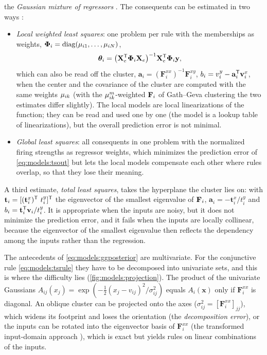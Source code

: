 the \emph{Gaussian mixture of regressors} \cite{gershenfeld:1999:cwm}. The consequents can be estimated in two ways \cite{abonyi:2002:mgg,abonyi:2000:localglobal}:
\begin{itemize}
  \item \emph{Local weighted least squares}: one problem per rule with the memberships as weights, $\boldsymbol\Phi_i=\operatorname{diag}(\mu_{i1},\dots,\mu_{iN})$,
  \begin{equation}
    \boldsymbol\theta_i=\big(\mathbf{X}_e^{\mathsf{T}}\boldsymbol\Phi_i\mathbf{X}_e\big)^{-1}\mathbf{X}_e^{\mathsf{T}}\boldsymbol\Phi_i\mathbf{y},
    \label{eq:models:wls}
  \end{equation}
  which can also be read off the cluster, $\mathbf{a}_i=(\mathbf{F}^{xx}_i)^{-1}\mathbf{F}^{xy}_i$, $b_i=v^y_i-\mathbf{a}_i^{\mathsf{T}}\mathbf{v}^x_i$, when the center and the covariance of the cluster are computed with the same weights $\mu_{ik}$ (with the $\mu_{ik}^m$-weighted $\mathbf{F}_i$ of Gath--Geva clustering the two estimates differ slightly). The local models are local linearizations of the function; they can be read and used one by one (the model is a lookup table of linearizations), but the overall prediction error is not minimal.
  \item \emph{Global least squares}: all consequents in one problem with the normalized firing strengths as regressor weights, which minimizes the prediction error of \eqref{eq:models:tsout} but lets the local models compensate each other where rules overlap, so that they lose their meaning.
\end{itemize}
A third estimate, \emph{total least squares}, takes the hyperplane the cluster lies on: with $\mathbf{t}_i=[(\mathbf{t}^x_i)^{\mathsf{T}}\ t^y_i]^{\mathsf{T}}$ the eigenvector of the smallest eigenvalue of $\mathbf{F}_i$, $\mathbf{a}_i=-\mathbf{t}^x_i/t^y_i$ and $b_i=\mathbf{t}_i^{\mathsf{T}}\mathbf{v}_i/t^y_i$. It is appropriate when the inputs are noisy, but it does not minimize the prediction error, and it fails when the inputs are locally collinear, because the eigenvector of the smallest eigenvalue then reflects the dependency among the inputs rather than the regression.

The antecedents of \eqref{eq:models:ggposterior} are multivariate. For the conjunctive rule \eqref{eq:models:tsrule} they have to be decomposed into univariate sets, and this is where the difficulty lies (\cref{fig:models:projection}). The product of the univariate Gaussians $A_{ij}(x_j)=\exp(-\tfrac12(x_j-v_{ij})^2/\sigma_{ij}^2)$ equals $A_i(\mathbf{x})$ only if $\mathbf{F}^{xx}_i$ is diagonal. An oblique cluster can be projected onto the axes ($\sigma^2_{ij}=[\mathbf{F}^{xx}_i]_{jj}$), which widens its footprint and loses the orientation (the \emph{decomposition error}), or the inputs can be rotated into the eigenvector basis of $\mathbf{F}^{xx}_i$ (the transformed input-domain approach \cite{kim:1998:transformed}), which is exact but yields rules on linear combinations of the inputs.

